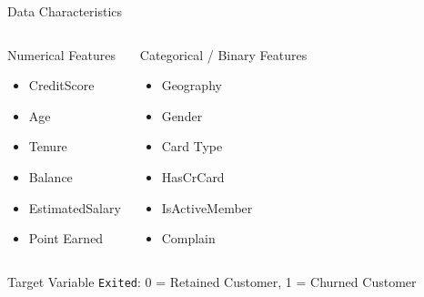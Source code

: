 \begin{frame}{Data Characteristics}

\begin{columns}


\begin{block}{Numerical Features}
\begin{itemize}
    \item CreditScore
    \item Age
    \item Tenure
    \item Balance
    \item EstimatedSalary
    \item Point Earned
\end{itemize}
\end{block}


\begin{block}{Categorical / Binary Features}
\begin{itemize}
    \item Geography
    \item Gender
    \item Card Type
    \item HasCrCard
    \item IsActiveMember
    \item Complain
\end{itemize}
\end{block}

\end{columns}

\vspace{0.2cm}

\begin{alertblock}{Target Variable}
\texttt{Exited}: 0 = Retained Customer, 1 = Churned Customer
\end{alertblock}

\end{frame}

